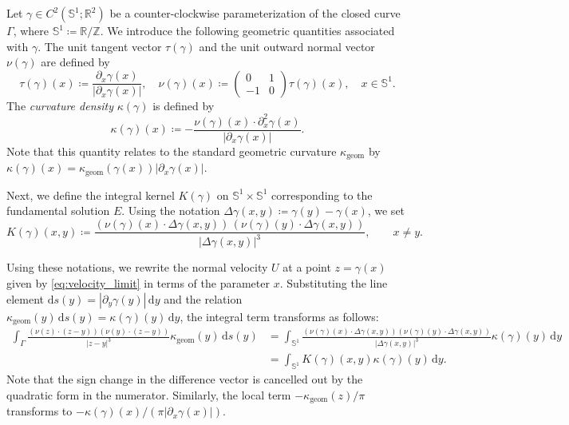 \documentclass{article}
\theoremstyle{remark}
\theoremstyle{definition}
\numberwithin{equation}{section}
\begin{document}
Let $\gamma \in C^2(\mathbb{S}^1; \mathbb{R}^2)$ be a counter-clockwise parameterization of the closed curve $\Gamma$, where $\mathbb{S}^1 \coloneqq \mathbb{R}/\mathbb{Z}$.
We introduce the following geometric quantities associated with $\gamma$.
The unit tangent vector $\tau(\gamma)$ and the unit outward normal vector $\nu(\gamma)$ are defined by
\begin{equation}
    \tau(\gamma)(x) \coloneqq \frac{\partial_x \gamma(x)}{|\partial_x \gamma(x)|}, \quad
    \nu(\gamma)(x) \coloneqq \begin{pmatrix}
        0&1\\
        -1&0
    \end{pmatrix} \tau(\gamma)(x), \quad x \in \mathbb{S}^1.
\end{equation}
The \textit{curvature density} $\kappa(\gamma)$ is defined by
\begin{equation}
    \kappa(\gamma)(x) \coloneqq -\frac{\nu(\gamma)(x) \cdot \partial_x^2 \gamma(x)}{|\partial_x \gamma(x)|}.
\end{equation}
Note that this quantity relates to the standard geometric curvature $\kappa_{\text{geom}}$ by $\kappa(\gamma)(x) = \kappa_{\text{geom}}(\gamma(x)) |\partial_x \gamma(x)|$.

Next, we define the integral kernel $K(\gamma)$ on $\mathbb{S}^1 \times \mathbb{S}^1$ corresponding to the fundamental solution $E$. Using the notation $\Delta\gamma(x,y) \coloneqq \gamma(y) - \gamma(x)$, we set
\begin{equation}
    K(\gamma)(x, y) \coloneqq \frac{(\nu(\gamma)(x) \cdot \Delta\gamma(x,y)) \, (\nu(\gamma)(y) \cdot \Delta\gamma(x,y))}{|\Delta\gamma(x,y)|^3}, \qquad x \neq y.
\end{equation}

Using these notations, we rewrite the normal velocity $U$ at a point $z = \gamma(x)$ given by \eqref{eq:velocity_limit} in terms of the parameter $x$. 
Substituting the line element $\mathrm{d}s(y) = |\partial_y \gamma(y)|\,\mathrm{d}y$ and the relation $\kappa_{\text{geom}}(y)\,\mathrm{d}s(y) = \kappa(\gamma)(y)\,\mathrm{d}y$, the integral term transforms as follows:
\begin{align*}
    \int_{\Gamma} \frac{(\nu(z) \cdot (z-y)) (\nu(y) \cdot (z-y))}{|z-y|^3} \kappa_{\text{geom}}(y) \, \mathrm{d}s(y) 
    &= \int_{\mathbb{S}^1} \frac{(\nu(\gamma)(x) \cdot \Delta\gamma(x,y)) (\nu(\gamma)(y) \cdot \Delta\gamma(x,y))}{|\Delta\gamma(x,y)|^3} \kappa(\gamma)(y) \, \mathrm{d}y \\
    &= \int_{\mathbb{S}^1} K(\gamma)(x, y) \kappa(\gamma)(y) \, \mathrm{d}y.
\end{align*}
Note that the sign change in the difference vector is cancelled out by the quadratic form in the numerator.
Similarly, the local term $- \kappa_{\text{geom}}(z)/\pi$ transforms to $-\kappa(\gamma)(x)/(\pi |\partial_x \gamma(x)|)$.
\end{document}
